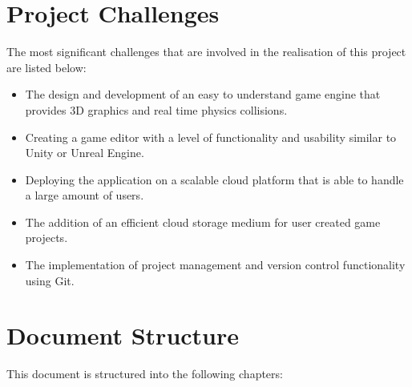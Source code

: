 \section{Project Challenges}
The most significant challenges that are involved in the realisation of this project are listed below:
\begin{itemize}
	\item The design and development of an easy to understand game engine that provides 3D graphics and real time physics collisions.
	\item Creating a game editor with a level of functionality and usability similar to Unity or Unreal Engine.
	\item Deploying the application on a scalable cloud platform that is able to handle a large amount of users.
	\item The addition of an efficient cloud storage medium for user created game projects.
	\item The implementation of project management and version control functionality using Git.
\end{itemize}

\section{Document Structure}
This document is structured into the following chapters: